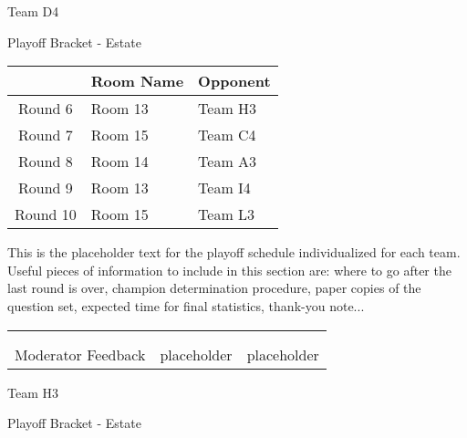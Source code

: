 \documentclass{article}%
\begin{document}
\newpage%
\begin{center}%
\begin{Huge}%
Team D4%
\end{Huge}%
\vspace*{12pt}%
\linebreak%
\begin{Large}%
Playoff Bracket {-} Estate%
\end{Large}%
\end{center}%
\vspace*{4pt}%
%
\begin{tabularx}{\textwidth}{|c|Y|Y|}%
\hline%
&Room Name&Opponent\\%
\hline%
Round 6&Room 13&Team H3\\%
Round 7&Room 15&Team C4\\%
Round 8&Room 14&Team A3\\%
Round 9&Room 13&Team I4\\%
Round 10&Room 15&Team L3\\%
\hline%
\end{tabularx}%
\vspace*{30pt}%
\linebreak%
This is the placeholder text for the playoff schedule individualized for each team. Useful pieces of information to include in this section are: where to go after the last round is over, champion determination procedure, paper copies of the question set, expected time for final statistics, thank{-}you note...%
\vspace*{30pt}%
\newline%
%
\begin{tabularx}{\textwidth}{YYY}%
  &  &  \\%
\\%
Moderator Feedback&placeholder&placeholder\\%
\end{tabularx}%
\newpage%
\begin{center}%
\begin{Huge}%
Team H3%
\end{Huge}%
\vspace*{12pt}%
\linebreak%
\begin{Large}%
Playoff Bracket {-} Estate%
\end{Large}%
\end{center}%
\end{document}
